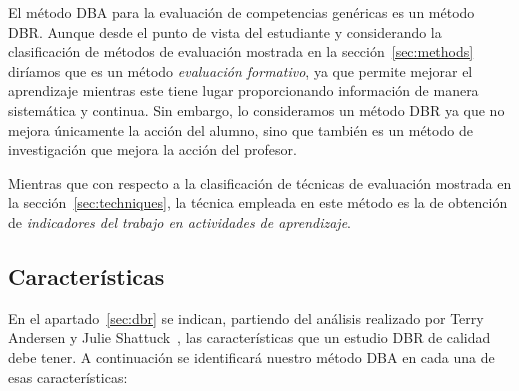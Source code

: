 El método DBA para la evaluación de competencias genéricas es un método DBR. Aunque desde el punto de vista del estudiante y considerando la clasificación de métodos de evaluación mostrada en la sección~\ref{sec:methods} diríamos que es un método \emph{evaluación formativo}, ya que permite mejorar el aprendizaje mientras este tiene lugar proporcionando información de manera sistemática y continua. Sin embargo, lo consideramos un método DBR ya que no mejora únicamente la acción del alumno, sino que también es un método de investigación que mejora la acción del profesor.

Mientras que con respecto a la clasificación de técnicas de evaluación mostrada en la sección~\ref{sec:techniques}, la técnica empleada en este método es la de obtención de \emph{indicadores del trabajo en actividades de aprendizaje}.

\subsection{Características}

En el apartado~\ref{sec:dbr} se indican, partiendo del análisis realizado por Terry Andersen y Julie Shattuck~\cite{anderson2012design}, las características que un estudio DBR de calidad debe tener. A continuación se identificará nuestro método DBA en cada una de esas características:

